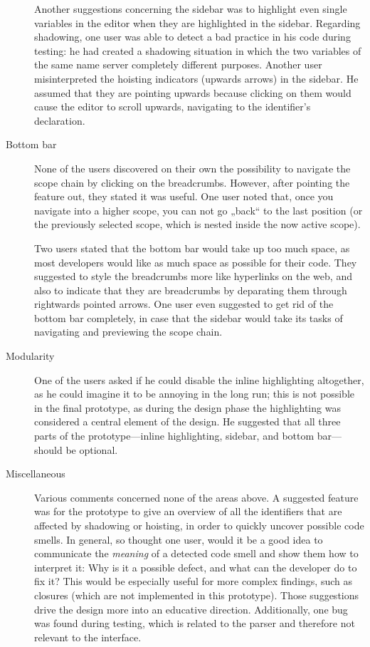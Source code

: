 \begin{description}
Another suggestions concerning the sidebar was to highlight even single
variables in the editor when they are highlighted in the sidebar.
Regarding shadowing, one user was able to detect a bad practice in his
code during testing: he had created a shadowing situation in which the
two variables of the same name server completely different purposes.
Another user misinterpreted the hoisting indicators (upwards arrows) in
the sidebar. He assumed that they are pointing upwards because clicking
on them would cause the editor to scroll upwards, navigating to the
identifier’s declaration.
\item[Bottom bar]
None of the users discovered on their own the possibility to navigate
the scope chain by clicking on the breadcrumbs. However, after pointing
the feature out, they stated it was useful. One user noted that, once
you navigate into a higher scope, you can not go „back“ to the last
position (or the previously selected scope, which is nested inside the
now active scope).

Two users stated that the bottom bar would take up too much space, as
most developers would like as much space as possible for their code.
They suggested to style the breadcrumbs more like hyperlinks on the web,
and also to indicate that they are breadcrumbs by deparating them
through rightwards pointed arrows. One user even suggested to get rid of
the bottom bar completely, in case that the sidebar would take its tasks
of navigating and previewing the scope chain.
\item[Modularity]
One of the users asked if he could disable the inline highlighting
altogether, as he could imagine it to be annoying in the long run; this
is not possible in the final prototype, as during the design phase the
highlighting was considered a central element of the design. He
suggested that all three parts of the prototype—inline highlighting,
sidebar, and bottom bar—should be optional.
\item[Miscellaneous]
Various comments concerned none of the areas above. A suggested feature
was for the prototype to give an overview of all the identifiers that
are affected by shadowing or hoisting, in order to quickly uncover
possible code smells. In general, so thought one user, would it be a
good idea to communicate the \emph{meaning} of a detected code smell and
show them how to interpret it: Why is it a possible defect, and what can
the developer do to fix it? This would be especially useful for more
complex findings, such as closures (which are not implemented in this
prototype). Those suggestions drive the design more into an educative
direction. Additionally, one bug was found during testing, which is
related to the parser and therefore not relevant to the interface.
\end{description}


